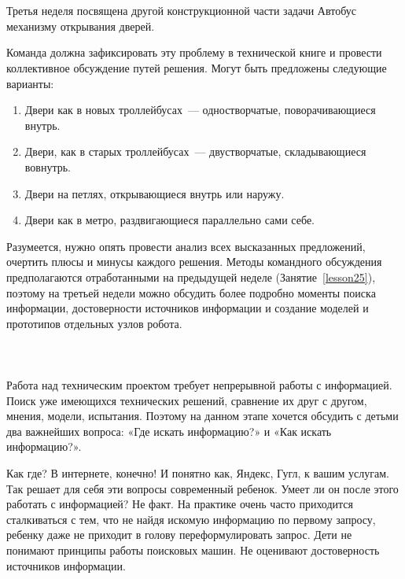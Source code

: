 {\hypertarget{lesson26x2}{}}\\\\

Третья неделя посвящена  другой конструкционной части задачи Автобус механизму открывания дверей. 

Команда должна зафиксировать эту проблему в технической книге и провести коллективное обсуждение путей решения. Могут быть предложены следующие варианты:

\begin{enumerate}
	\item Двери как в новых троллейбусах~--- одностворчатые, поворачивающиеся внутрь.
	\item Двери, как в старых троллейбусах~--- двустворчатые, складывающиеся вовнутрь.
	\item Двери на петлях, открывающиеся внутрь или наружу.
	\item Двери как в метро, раздвигающиеся параллельно сами себе.
\end{enumerate}

Разумеется, нужно опять провести анализ всех высказанных предложений, очертить плюсы и минусы каждого решения. Методы командного обсуждения предполагаются отработанными на предыдущей неделе (Занятие~\ref{lesson25}), поэтому на третьей недели можно обсудить более подробно моменты поиска информации, достоверности источников информации и создание моделей и прототипов отдельных узлов робота.\\\\

{\hypertarget{lesson26x3}{}}\\\\	

Работа над техническим проектом требует непрерывной работы с информацией. Поиск уже имеющихся технических решений, сравнение их друг с другом, мнения, модели, испытания. Поэтому  на данном этапе хочется обсудить с детьми два важнейших вопроса: «Где искать информацию?» и «Как искать информацию?».

Как где? В интернете, конечно! И понятно как, Яндекс, Гугл, к вашим услугам. Так решает для себя эти вопросы современный ребенок. Умеет ли он после этого работать с информацией? Не факт. На практике очень часто приходится сталкиваться с тем, что не найдя искомую информацию по первому запросу, ребенку даже не приходит в голову переформулировать запрос. Дети не понимают принципы работы поисковых машин. Не  оценивают достоверность источников информации.

